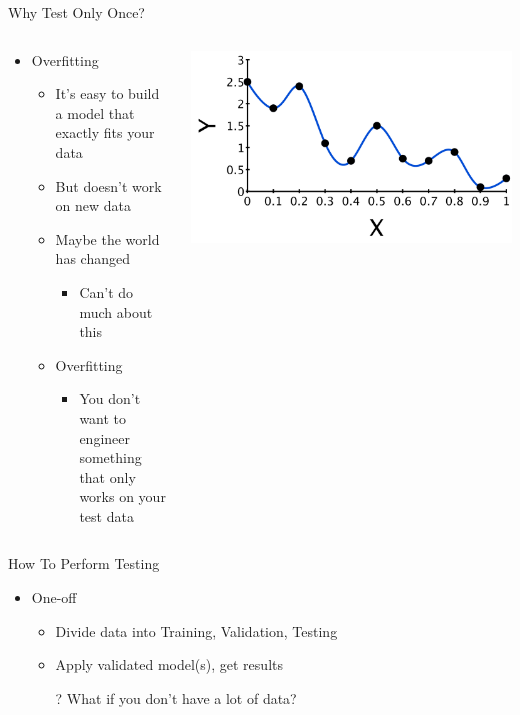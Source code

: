 \documentclass[aspectratio=169]{beamer}
\begin{document}
\begin{frame}{Why Test Only Once?}

\begin{columns}
\begin{column}{0.6\textwidth}
\begin{itemize}
\item Overfitting
	\begin{itemize}
	\item It's easy to build a model that exactly fits your data
	\item But doesn't work on new data
	\item Maybe the world has changed 
	\begin{itemize}
	\item Can't do much about this
\end{itemize}
	\item Overfitting  
	\begin{itemize}
	\item You don't want to engineer something that only works on your test data
\end{itemize}
	\end{itemize}
\end{itemize}
 \end{column}
\begin{column}{0.4\textwidth}
    \includegraphics[width=1\textwidth]{lectSup/overfitEx3.pdf} %

 \end{column}
 \end{columns}

\end{frame}
\begin{frame}[fragile]{How To Perform Testing}

\begin{itemize}
\item One-off
	\begin{itemize}
	\item Divide data into Training, Validation, Testing
	\item Apply validated model(s), get results
	\item[?] What if you don't have a lot of data?
	\end{itemize}
	\end{itemize}

\end{frame}
\end{document}

